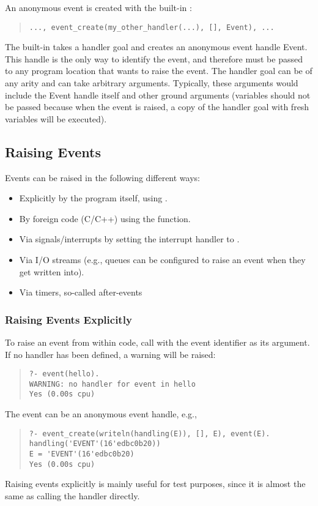 An anonymous event is created with the built-in
:
\begin{quote}
\begin{verbatim}
..., event_create(my_other_handler(...), [], Event), ...
\end{verbatim}
\end{quote}
The built-in takes a handler goal and creates an anonymous event handle Event.
This handle is the only way to identify the event, and therefore must be
passed to any program location that wants to raise the event.
The handler goal can be of any arity and can take arbitrary arguments.
Typically, these arguments would include the Event handle itself and other
ground arguments (variables should not be passed because when the event
is raised, a copy of the handler goal with fresh variables will be executed).


\subsection{Raising Events}
Events can be raised in the following different ways:
\begin{itemize}
\item Explicitly by the {\eclipse} program itself, using
    .
\item By foreign code (C/C++) using the  function.
\item Via signals/interrupts by setting the interrupt handler to
    .
\item Via I/O streams (e.g., queues can be configured to raise an event
    when they get written into).
\item Via timers, so-called after-events
\end{itemize}

\subsubsection{Raising Events Explicitly}
To raise an event from within {\eclipse} code, call
 with the event
identifier as its argument. If no handler has been defined, a warning
will be raised:
\begin{quote}
\begin{verbatim}
?- event(hello).
WARNING: no handler for event in hello
Yes (0.00s cpu)
\end{verbatim}
\end{quote}
The event can be an anonymous event handle, e.g.,
\begin{quote}
\begin{verbatim}
?- event_create(writeln(handling(E)), [], E), event(E).
handling('EVENT'(16'edbc0b20))
E = 'EVENT'(16'edbc0b20)
Yes (0.00s cpu)
\end{verbatim}
\end{quote}
Raising events explicitly is mainly useful for test purposes, since
it is almost the same as calling the handler directly.


